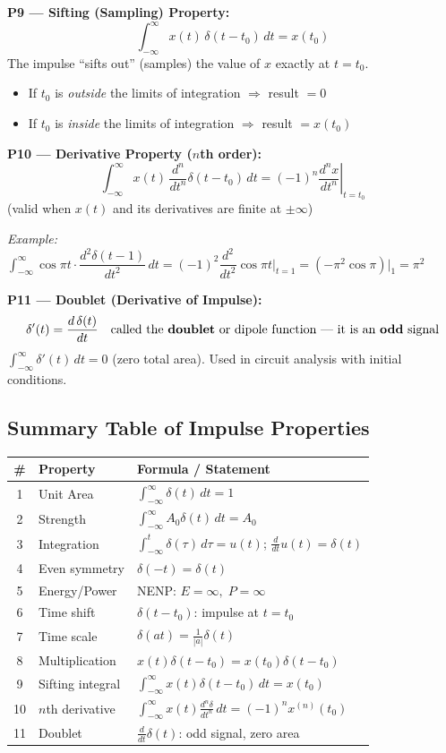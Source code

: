 \documentclass[10pt,a4paper]{article}
\newcommand{\Int}{\displaystyle\int_{-\infty}^{\infty}}
\newcommand{\Intt}{\displaystyle\int_{-\infty}^{t}}
\begin{document}
\begin{propbox}
\medskip
\textbf{P9 --- Sifting (Sampling) Property:}
\[
  \Int x(t)\,\delta(t - t_0)\,dt = x(t_0)
\]
The impulse ``sifts out'' (samples) the value of $x$ exactly at $t = t_0$.
\begin{itemize}
  \item If $t_0$ is \emph{outside} the limits of integration $\Rightarrow$ result $= 0$
  \item If $t_0$ is \emph{inside} the limits of integration $\Rightarrow$ result $= x(t_0)$
\end{itemize}

\medskip
\textbf{P10 --- Derivative Property ($n$th order):}
\[
  \Int x(t)\,\frac{d^n}{dt^n}\delta(t - t_0)\,dt = (-1)^n \left.\frac{d^n x}{dt^n}\right|_{t=t_0}
\]
(valid when $x(t)$ and its derivatives are finite at $\pm\infty$)

\quad\textit{Example:} $\Int \cos\pi t \cdot \dfrac{d^2\delta(t-1)}{dt^2}\,dt = (-1)^2 \dfrac{d^2}{dt^2}\cos\pi t\Big|_{t=1} = (-\pi^2\cos\pi)\big|_1 = \pi^2$

\medskip
\textbf{P11 --- Doublet (Derivative of Impulse):}
\[
  \delta'(t) = \frac{d\,\delta(t)}{dt} \quad \text{called the \textbf{doublet} or dipole function --- it is an \textbf{odd} signal}
\]
$\Int \delta'(t)\,dt = 0$ (zero total area). Used in circuit analysis with initial conditions.
\end{propbox}

\subsection*{Summary Table of Impulse Properties}

\begin{center}
{\small
\begin{tabular}{@{}c l l@{}}
\toprule
\textbf{\#} & \textbf{Property} & \textbf{Formula / Statement}\\
\midrule
1 & Unit Area & $\Int\delta(t)\,dt=1$ \\[4pt]
2 & Strength & $\Int A_0\delta(t)\,dt=A_0$ \\[4pt]
3 & Integration & $\Intt\delta(\tau)\,d\tau=u(t)$; \quad $\tfrac{d}{dt}u(t)=\delta(t)$ \\[4pt]
4 & Even symmetry & $\delta(-t)=\delta(t)$ \\[2pt]
5 & Energy/Power & NENP: $E=\infty,\;P=\infty$ \\[2pt]
6 & Time shift & $\delta(t-t_0)$: impulse at $t=t_0$ \\[2pt]
7 & Time scale & $\delta(at)=\tfrac{1}{|a|}\delta(t)$ \\[4pt]
8 & Multiplication & $x(t)\delta(t-t_0)=x(t_0)\delta(t-t_0)$ \\[4pt]
9 & Sifting integral & $\Int x(t)\delta(t-t_0)\,dt=x(t_0)$ \\[4pt]
10 & $n$th derivative & $\Int x(t)\frac{d^n\delta}{dt^n}\,dt=(-1)^n x^{(n)}(t_0)$ \\[4pt]
11 & Doublet & $\tfrac{d}{dt}\delta(t)$: odd signal, zero area \\[2pt]
\bottomrule
\end{tabular}
}
\end{center}
\end{document}
